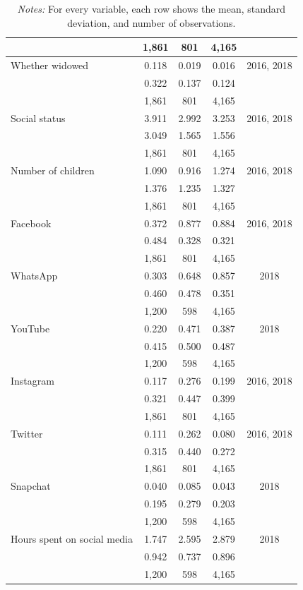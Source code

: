 \documentclass[12pt]{article}
\begin{document}
\begin{table}[H]
{\begin{tabular}{lcccc}
& 1,861  & 801    & 4,165   &      \\ \hline
Whether widowed  & 0.118 &  0.019 &  0.016  & 2016, 2018 \\
 &  0.322 & 0.137  & 0.124   &   \\
& 1,861  & 801    & 4,165   &      \\ \hline
Social status  & 3.911  & 2.992  & 3.253   & 2016, 2018 \\
 & 3.049   & 1.565  & 1.556   &   \\
& 1,861  & 801    & 4,165  &     \\ \hline
Number of children   & 1.090     & 0.916 & 1.274    & 2016, 2018 \\
& 1.376     & 1.235  & 1.327   &    \\
& 1,861  & 801    & 4,165   &      \\ \hline
Facebook  & 0.372   & 0.877 & 0.884    & 2016, 2018 \\
& 0.484   & 0.328   & 0.321  &   \\
& 1,861  & 801   & 4,165  &    \\ \hline
WhatsApp   & 0.303   & 0.648   & 0.857   & 2018       \\
& 0.460  & 0.478   & 0.351      &     \\
& 1,200      & 598    & 4,165       &            \\ \hline
YouTube   & 0.220     & 0.471  & 0.387    & 2018   \\
& 0.415     & 0.500  & 0.487      &            \\
& 1,200      & 598  & 4,165       &            \\ \hline
Instagram     & 0.117     & 0.276    & 0.199      & 2016, 2018 \\
 & 0.321     & 0.447  & 0.399      &        \\
& 1,861      & 801    & 4,165   &        \\ \hline
Twitter  & 0.111     & 0.262  & 0.080   & 2016, 2018 \\
 & 0.315     & 0.440    & 0.272    &       \\
 & 1,861      & 801   & 4,165   &      \\ \hline
Snapchat& 0.040     & 0.085  & 0.043   & 2018    \\
& 0.195     & 0.279  & 0.203     &       \\
& 1,200      & 598    & 4,165   &     \\ \hline
Hours spent on social media   & 1.747   & 2.595                                                           & 2.879      & 2018       \\
& 0.942     & 0.737 & 0.896   &   \\
& 1,200    & 598   & 4,165    &  \\ \hline 
\end{tabular}}
\captionsetup{width=1\linewidth}
\caption*{\footnotesize \textit{Notes:} For every variable, each row shows the mean, standard deviation, and number of observations.}
\end{table}
\end{document}
